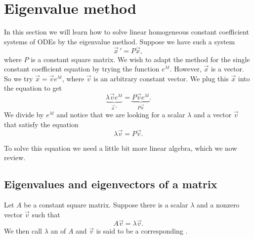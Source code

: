 \documentclass[12pt]{book}
\begin{document}

\sectionnewpage
\section{Eigenvalue method}


In this section we will learn how to solve linear homogeneous constant
coefficient systems of ODEs by the eigenvalue method.
Suppose we have such a system
\begin{equation*}
{\vec{x}\,}' = P\vec{x} ,
\end{equation*}
where
$P$ is a
constant square matrix.
We wish to
adapt the method for the single
constant coefficient equation by trying the function $e^{\lambda t}$.
However, $\vec{x}$ is a vector.  So we try $\vec{x} = \vec{v} e^{\lambda t}$, where
$\vec{v}$ is an arbitrary constant vector.  We plug this $\vec{x}$ into the equation to get
\begin{equation*}
\underbrace{\lambda \vec{v} e^{\lambda t}}_{{\vec{x}\,}'} =
\underbrace{P\vec{v} e^{\lambda t}}_{P\vec{x}} .
\end{equation*}
We divide by $e^{\lambda t}$ and notice that we are looking for a scalar $\lambda$
and a vector $\vec{v}$ that satisfy the equation
\begin{equation*}
\lambda \vec{v} = P\vec{v} .
\end{equation*}

To solve this equation we need a little bit more linear algebra, which we now
review.

\subsection{Eigenvalues and eigenvectors of a matrix}

Let $A$ be a constant square matrix.  Suppose there is a
scalar $\lambda$ and a nonzero vector $\vec{v}$ such that
\begin{equation*}
A \vec{v} = \lambda \vec{v}.
\end{equation*}
We then call $\lambda$ an \emph{} of $A$ and $\vec{v}$
is said to be a corresponding \emph{}.
\end{document}
